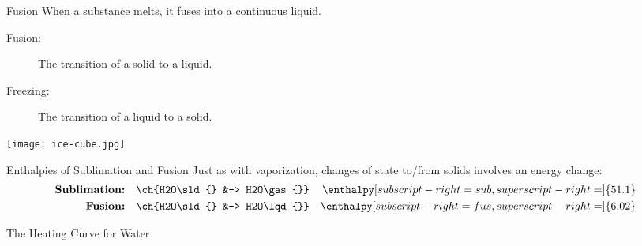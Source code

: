 \documentclass[notes=hide]{beamer}
\begin{document}

\begin{frame}{Fusion}
	When a substance melts, it \alert{fuses} into a continuous liquid.
	\begin{description}
		\item[Fusion:] The transition of a solid to a liquid.
		\item[Freezing:] The transition of a liquid to a solid.
	\end{description}

	\bigskip

	\begin{center}
		\texttt{[image: ice-cube.jpg]}
	\end{center}
\end{frame}


\begin{frame}{Enthalpies of Sublimation and Fusion}
	Just as with vaporization, changes of state to/from solids involves an
	energy change:
	\begin{align*}
		\textbf{Sublimation:} && \ch{H2O\sld{} &-> H2O\gas{}} &&
		\enthalpy[subscript-right=sub,superscript-right=]{51.1} \\
		\textbf{Fusion:} && \ch{H2O\sld{} &-> H2O\lqd{}} &&
		\enthalpy[subscript-right=fus,superscript-right=]{6.02}
	\end{align*}

	\smallskip

	\begin{center}
	\end{center}
\end{frame}


\begin{frame}{The Heating Curve for Water}
	\begin{center}
\end{center}
\end{frame}
\end{document}
